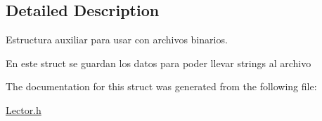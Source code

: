 \subsection{Detailed Description}
Estructura auxiliar para usar con archivos binarios. 

En este struct se guardan los datos para poder llevar strings al archivo 

The documentation for this struct was generated from the following file\+:\begin{DoxyCompactItemize}
\item 
\hyperlink{_lector_8h}{Lector.\+h}\end{DoxyCompactItemize}
